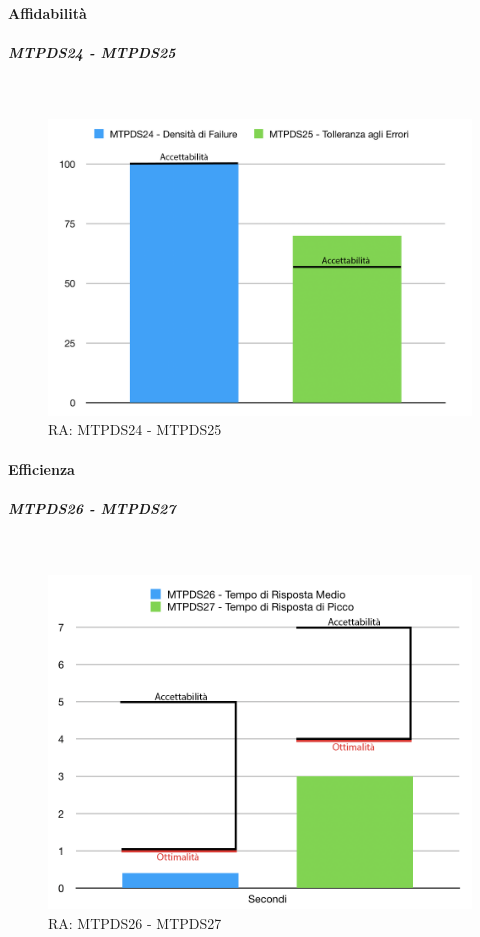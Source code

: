\paragraph{Affidabilità}

\subparagraph{MTPDS24 - MTPDS25} \-\\

\begin{figure}[H]
	\begin{center}
		\includegraphics[scale=0.5]{./images/grafici_RA/Affidabilita.png} 
		\caption{RA: MTPDS24 - MTPDS25}
	\end{center}
\end{figure}

\paragraph{Efficienza}

\subparagraph{MTPDS26 - MTPDS27} \-\\

\begin{figure}[H]
	\begin{center}
		\includegraphics[scale=0.5]{./images/grafici_RA/Efficienza.png} 
		\caption{RA: MTPDS26 - MTPDS27}
	\end{center}
\end{figure}

